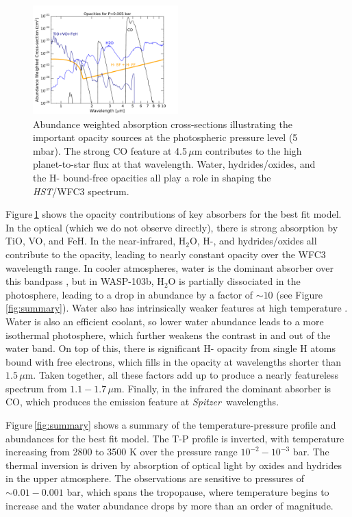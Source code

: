 \documentclass[twocolumn]{aastex61}
\newcommand{\project}[1]{\textsl{#1}}
\newcommand{\HST}{\project{HST}}
\newcommand{\Spitzer}{\project{Spitzer}}
\begin{document}
\begin{figure}
\includegraphics[width = 0.5\textwidth]{Figures/xsec_FULL.pdf}
\caption{Abundance weighted absorption cross-sections illustrating the important opacity sources at the photospheric pressure level (5 mbar). The strong CO feature at 4.5\,$\mu$m contributes to the high planet-to-star flux at that wavelength.  Water, hydrides/oxides, and the H- bound-free opacities all play a role in shaping the \HST/WFC3 spectrum.}
\label{fig:opacities}
\end{figure}

Figure\,\ref{fig:opacities} shows the opacity contributions of key absorbers for the best fit model.  In the optical (which we do not observe directly), there is strong absorption by TiO, VO, and FeH.  In the near-infrared, H$_2$O, H-, and hydrides/oxides all contribute to the opacity, leading to nearly constant opacity over the WFC3 wavelength range.  In cooler atmospheres, water is the dominant absorber over this bandpass \citep[e.g.][]{kreidberg14b, line16}, but in WASP-103b, H$_2$O is partially dissociated in the photosphere, leading to a drop in abundance by a factor of $\sim10$ (see Figure\,\ref{fig:summary}). Water also has intrinsically weaker features at high temperature \citep{tinetti12}. Water is also an efficient coolant, so lower water abundance leads to a more isothermal photosphere, which further weakens the contrast in and out of the water band. On top of this, there is significant H- opacity from single H atoms bound with free electrons, which fills in the opacity at wavelengths shorter than $1.5\,\mu$m.  Taken together, all these factors add up to produce a nearly featureless spectrum from $1.1 - 1.7\,\mu$m. Finally, in the infrared the dominant absorber is CO, which produces the emission feature at \Spitzer\ wavelengths.  

Figure\,\ref{fig:summary} shows a summary of the temperature-pressure profile and abundances for the best fit model. The T-P profile is inverted, with temperature increasing from 2800 to 3500 K over the pressure range $10^{-2} - 10^{-3}$ bar.  The  thermal inversion is driven by absorption of optical light by oxides and hydrides in the upper atmosphere.  The observations are sensitive to pressures of $\sim0.01 - 0.001$ bar, which spans the tropopause, where temperature begins to increase and the water abundance drops by more than an order of magnitude.
\end{document}
